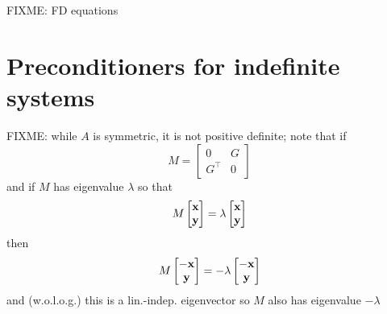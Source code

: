 FIXME: FD equations


\section{Preconditioners for indefinite systems}

FIXME: while $A$ is symmetric, it is not positive definite; note that if
    $$M = \begin{bmatrix} 0 & G \\ G^\top & 0 \end{bmatrix}$$
and if $M$ has eigenvalue $\lambda$ so that
    $$M \begin{bmatrix} \mathbf{x} \\ \mathbf{y} \end{bmatrix} = \lambda \begin{bmatrix} \mathbf{x} \\ \mathbf{y} \end{bmatrix}$$
then
    $$M \begin{bmatrix} -\mathbf{x} \\ \mathbf{y} \end{bmatrix} = - \lambda \begin{bmatrix} -\mathbf{x} \\ \mathbf{y} \end{bmatrix}$$
and (w.o.l.o.g.) this is a lin.-indep. eigenvector so $M$ also has eigenvalue $-\lambda$




